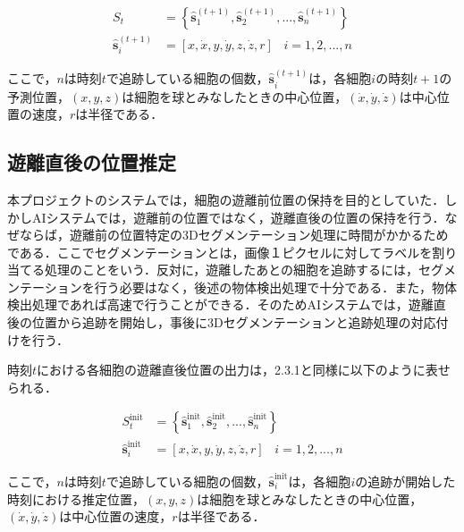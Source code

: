 \begin{equation}
    \label{output1}
    \begin{aligned}
        S_t &= \left\{\hat{\bm{s}}_1^{(t+1)}, \hat{\bm{s}}_2^{(t+1)}, ..., \hat{\bm{s}}_n^{(t+1)}\right\}
        \\ \hat{\bm{s}}_i^{(t+1)} &= \left[x, \dot{x}, y, \dot{y}, z, \dot{z}, r\right] \hspace{10pt} i = 1,2,...,n
    \end{aligned}
\end{equation}

ここで，$n$は時刻$t$で追跡している細胞の個数，$\hat{\bm{s}}_i^{(t+1)}$は，各細胞$i$の時刻$t+1$の予測位置，$(x,y,z)$は細胞を球とみなしたときの中心位置，$(\dot{x},\dot{y}, \dot{z})$は中心位置の速度，$r$は半径である．

\subsection{遊離直後の位置推定}
本プロジェクトのシステムでは，細胞の遊離前位置の保持を目的としていた．しかしAIシステムでは，遊離前の位置ではなく，遊離直後の位置の保持を行う．なぜならば，遊離前の位置特定の3Dセグメンテーション処理に時間がかかるためである．ここでセグメンテーションとは，画像１ピクセルに対してラベルを割り当てる処理のことをいう．反対に，遊離したあとの細胞を追跡するには，セグメンテーションを行う必要はなく，後述の物体検出処理で十分である．また，物体検出処理であれば高速で行うことができる．そのためAIシステムでは，遊離直後の位置から追跡を開始し，事後に3Dセグメンテーションと追跡処理の対応付けを行う．
\par
時刻$t$における各細胞の遊離直後位置の出力は，2.3.1と同様に以下のように表せられる．

\begin{equation}
    \label{output1}
    \begin{aligned}
        S_t^{\textrm{init}} &= \left\{\hat{\bm{s}}_1^{\textrm{init}}, \hat{\bm{s}}_2^{\textrm{init}}, ..., \hat{\bm{s}}_n^{\textrm{init}}\right\}
        \\ \hat{\bm{s}}_i^{\textrm{init}} &= \left[x, \dot{x}, y, \dot{y}, z, \dot{z}, r\right] \hspace{10pt} i = 1,2,...,n
    \end{aligned}
\end{equation}

ここで，$n$は時刻$t$で追跡している細胞の個数，$\hat{\bm{s}}_i^{\textrm{init}}$は，各細胞$i$の追跡が開始した時刻における推定位置，$(x,y,z)$は細胞を球とみなしたときの中心位置，$(\dot{x},\dot{y}, \dot{z})$は中心位置の速度，$r$は半径である．

